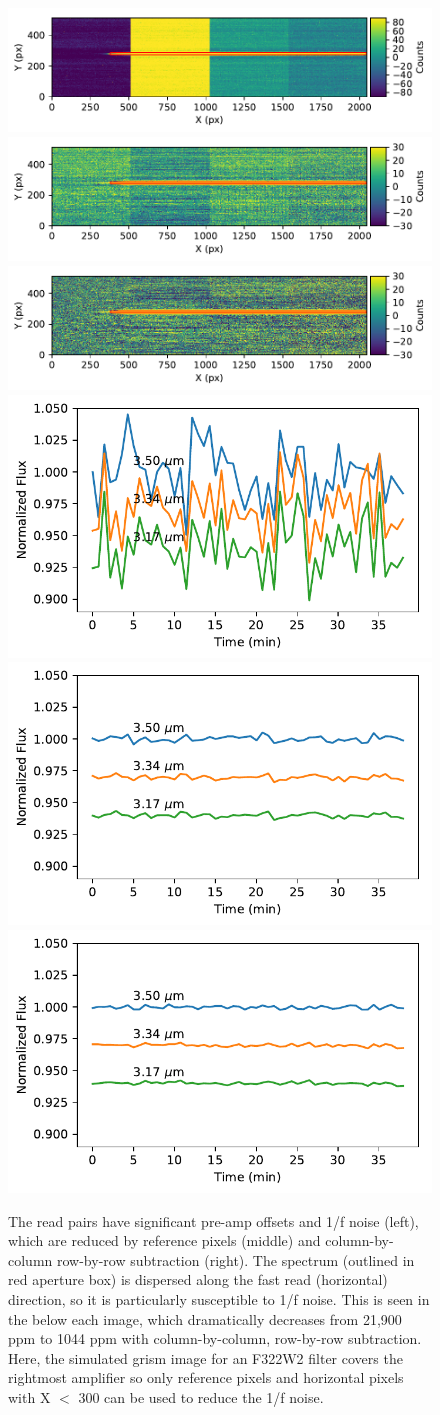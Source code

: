 \documentclass{aastex62}
\begin{document}
\begin{figure}[!hbtp]
\centering
\includegraphics[width=.32\columnwidth]{spec_aps_pairwiseSubNoRed_otisLongDarkSimGrism.pdf}
\includegraphics[width=.32\columnwidth]{spec_aps_pairwiseSubRed_covWeights_otisLongDarkSimGrism.pdf}
\includegraphics[width=.32\columnwidth]{spec_aps_pairwiseSub_backsub_otisLongDarkSimGrism.pdf}
\includegraphics[width=.32\columnwidth]{tser_pairwiseSub_noRed01.pdf}
\includegraphics[width=.32\columnwidth]{tser_pairwiseSubRed.pdf}
\includegraphics[width=.32\columnwidth]{tser_pairwiseSubRed_backsub.pdf}
\caption{The read pairs have significant pre-amp offsets and 1/f noise (left), which are reduced by reference pixels (middle) and column-by-column row-by-row subtraction (right).
The spectrum (outlined in red aperture box) is dispersed along the fast read (horizontal) direction, so it is particularly susceptible to 1/f noise.
This is seen in the below each image, which dramatically decreases from 21,900 ppm to 1044 ppm with column-by-column, row-by-row subtraction.
Here, the simulated grism image for an F322W2 filter covers the rightmost amplifier so only reference pixels and horizontal pixels with X $<$ 300 can be used to reduce the 1/f noise.
}\label{fig:longDarkGrism}
\end{figure}
\end{document}
